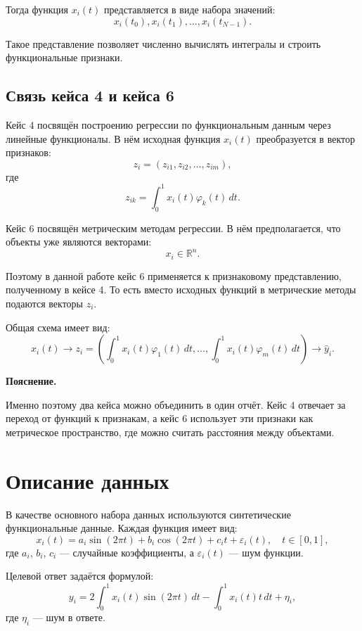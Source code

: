 \documentclass[14pt,a4paper]{extarticle}
\newenvironment{explanation}
{
    \vspace{0.2cm}
    \noindent\textbf{Пояснение.}
}
{
    \vspace{0.2cm}
}
\begin{document}
Тогда функция \(x_i(t)\) представляется в виде набора значений:
\[
x_i(t_0), x_i(t_1), \dots, x_i(t_{N-1}).
\]

Такое представление позволяет численно вычислять интегралы и строить функциональные признаки.

\subsection{Связь кейса 4 и кейса 6}

Кейс 4 посвящён построению регрессии по функциональным данным через линейные функционалы. В нём исходная функция \(x_i(t)\) преобразуется в вектор признаков:
\[
z_i = (z_{i1}, z_{i2}, \dots, z_{im}),
\]
где
\[
z_{ik}=\int_0^1 x_i(t)\varphi_k(t)\,dt.
\]

Кейс 6 посвящён метрическим методам регрессии. В нём предполагается, что объекты уже являются векторами:
\[
x_i \in \mathbb{R}^n.
\]

Поэтому в данной работе кейс 6 применяется к признаковому представлению, полученному в кейсе 4. То есть вместо исходных функций в метрические методы подаются векторы \(z_i\).

Общая схема имеет вид:
\[
x_i(t)
\longrightarrow
z_i=
\left(
\int_0^1 x_i(t)\varphi_1(t)\,dt,
\dots,
\int_0^1 x_i(t)\varphi_m(t)\,dt
\right)
\longrightarrow
\hat y_i.
\]

\begin{explanation}
Именно поэтому два кейса можно объединить в один отчёт. Кейс 4 отвечает за переход от функций к признакам, а кейс 6 использует эти признаки как метрическое пространство, где можно считать расстояния между объектами.
\end{explanation}


\section{Описание данных}

В качестве основного набора данных используются синтетические функциональные данные. Каждая функция имеет вид:
\[
x_i(t)=a_i\sin(2\pi t)+b_i\cos(2\pi t)+c_it+\varepsilon_i(t),
\quad t\in[0,1],
\]
где \(a_i\), \(b_i\), \(c_i\) — случайные коэффициенты, а \(\varepsilon_i(t)\) — шум функции.

Целевой ответ задаётся формулой:
\[
y_i=
2\int_0^1x_i(t)\sin(2\pi t)\,dt
-
\int_0^1x_i(t)t\,dt
+\eta_i,
\]
где \(\eta_i\) — шум в ответе.
\end{document}
